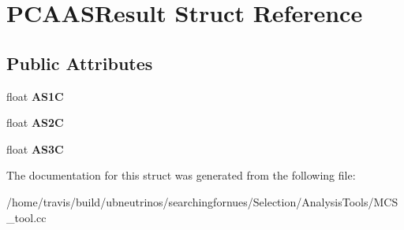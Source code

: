 \hypertarget{structPCAASResult}{}\section{P\+C\+A\+A\+S\+Result Struct Reference}
\label{structPCAASResult}
\subsection*{Public Attributes}
\begin{DoxyCompactItemize}
\item 
float {\bfseries A\+S1C}\hypertarget{structPCAASResult_af549f93e3d9a16c9d564c64927e864ef}{}\label{structPCAASResult_af549f93e3d9a16c9d564c64927e864ef}

\item 
float {\bfseries A\+S2C}\hypertarget{structPCAASResult_aae2ec53955cf99d7bcbc5fdc0d95e273}{}\label{structPCAASResult_aae2ec53955cf99d7bcbc5fdc0d95e273}

\item 
float {\bfseries A\+S3C}\hypertarget{structPCAASResult_af044515c78810f6c6b818185e3fd5dfc}{}\label{structPCAASResult_af044515c78810f6c6b818185e3fd5dfc}

\end{DoxyCompactItemize}


The documentation for this struct was generated from the following file\+:\begin{DoxyCompactItemize}
\item 
/home/travis/build/ubneutrinos/searchingfornues/\+Selection/\+Analysis\+Tools/M\+C\+S\+\_\+tool.\+cc\end{DoxyCompactItemize}
